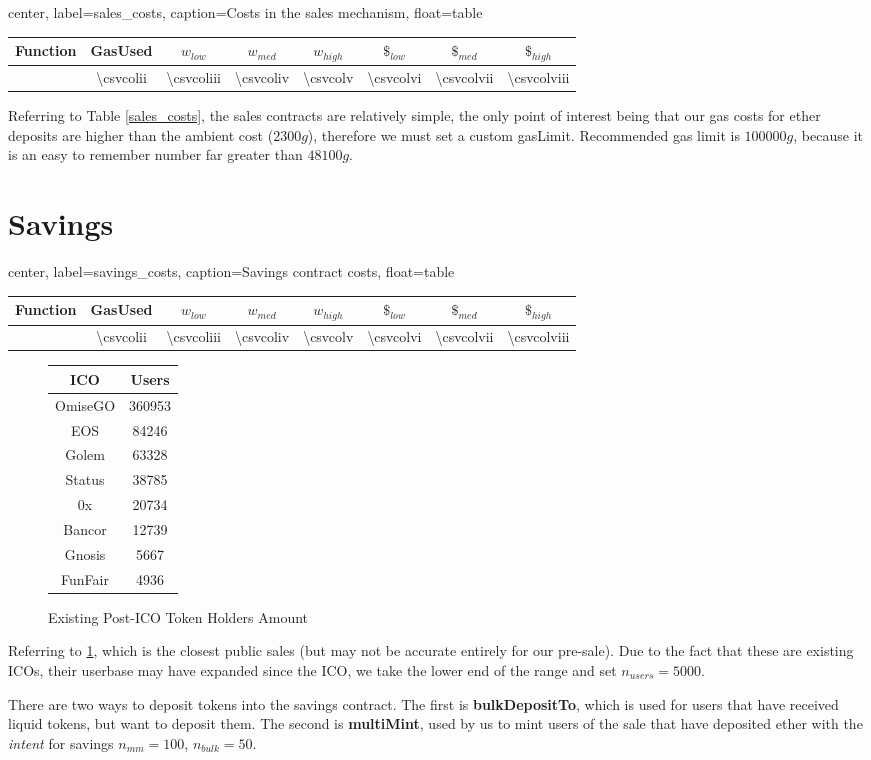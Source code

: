 \documentclass[a4paper,english]{article}
\newcommand{\rnd}[1]{
  \num[round-mode=places, round-precision=2]{#1}
}
\newcommand{\graphcosts}[1]{
\begin{tabular}{|c|c|c|c|c|c|c|c|}%
    \hline
    \textbf{Function} & \textbf{GasUsed} & \textbf{$w_{low}$} & \textbf{$w_{med}$} & \textbf{$w_{high}$} & \textbf{$\$_{low}$} & \textbf{$\$_{med}$} & \textbf{$\$_{high}$}%
    \csvreader[head to column names]{#1}{}%
    {\\\hline\csvcoli&\rnd{\csvcolii}&\rnd{\csvcoliii}&\rnd{\csvcoliv}&\rnd{\csvcolv}&\rnd{\csvcolvi}&\rnd{\csvcolvii}&\rnd{\csvcolviii}}%
    \\\hline
\end{tabular}
}
\begin{document}
\begin{adjustbox}{center, label={sales_costs}, caption={Costs in the sales mechanism}, float=table}
  \graphcosts{sales_gas.csv}
\end{adjustbox}

Referring to Table \ref{sales_costs}, the sales contracts are relatively simple, the only point of interest being that our gas costs for ether deposits are higher than the ambient cost ($2300g$), therefore we must set a custom gasLimit. Recommended gas limit is $100000g$, because it is an easy to remember number far greater than $48100g$.

\section{Savings}

\begin{adjustbox}{center, label={savings_costs}, caption={Savings contract costs}, float=table}
  \graphcosts{savings_costs.csv}
\end{adjustbox}

\begin{figure}
  \begin{center}
    \begin{tabular}{|c|c|}
    \hline
    \textbf{ICO} & \textbf{Users} \\
    \hline
    OmiseGO & 360953 \\
    EOS & 84246 \\
    Golem & 63328 \\
    Status & 38785 \\
    0x & 20734 \\
    Bancor & 12739 \\
    Gnosis & 5667 \\
    FunFair & 4936 \\
    \hline
    \end{tabular}
    \label{holders}
    \caption{Existing Post-ICO Token Holders Amount}
  \end{center}
\end{figure}

Referring to \ref{holders}, which is the closest public sales (but may not be accurate entirely for our pre-sale). Due to the fact that these are existing ICOs, their userbase may have expanded since the ICO, we take the lower end of the range and set $n_{users}=5000$.

There are two ways to deposit tokens into the savings contract. The first is \textbf{bulkDepositTo}, which is used for users that have received liquid tokens, but want to deposit them. The second is \textbf{multiMint}, used by us to mint users of the sale that have deposited ether with the \textit{intent} for savings $n_{mm} = 100$, $n_{bulk} = 50$.
\end{document}
